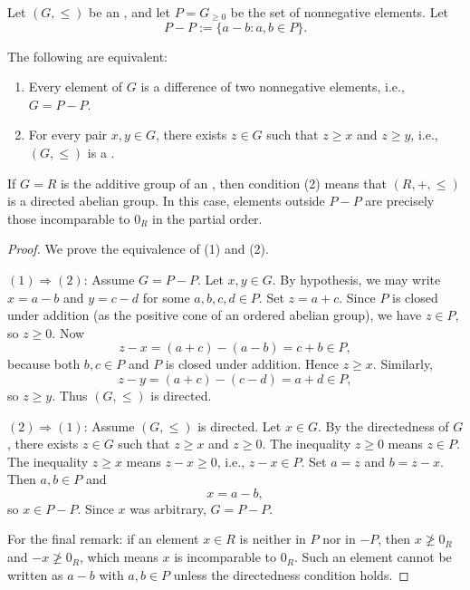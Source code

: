 \begin{proposition} \label{proposition:ordered_abelian_group_equals_P_minus_P_iff_directed}
    Let $(G,\leq)$ be an , and let $P = G_{\geq 0}$ be the set of nonnegative elements. Let
    $$P - P := \{a - b : a,b \in P\}.$$

    The following are equivalent:
    \begin{enumerate}
        \item Every element of $G$ is a difference of two nonnegative elements, i.e., $G = P - P$.
        \item For every pair $x,y \in G$, there exists $z \in G$ such that $z \geq x$ and $z \geq y$, i.e., $(G,\leq)$ is a .
    \end{enumerate}

    If $G = R$ is the additive group of an , then condition (2) means that $(R,+,\leq)$ is a directed abelian group. In this case, elements outside $P - P$ are precisely those incomparable to $0_R$ in the partial order.
\end{proposition}

\begin{proof}
    We prove the equivalence of (1) and (2).

    $(1) \Rightarrow (2)$: Assume $G = P - P$. Let $x,y \in G$. By hypothesis, we may write $x = a - b$ and $y = c - d$ for some $a,b,c,d \in P$. Set $z = a + c$. Since $P$ is closed under addition (as the positive cone of an ordered abelian group), we have $z \in P$, so $z \geq 0$. Now
    $$z - x = (a + c) - (a - b) = c + b \in P,$$
    because both $b,c \in P$ and $P$ is closed under addition. Hence $z \geq x$. Similarly,
    $$z - y = (a + c) - (c - d) = a + d \in P,$$
    so $z \geq y$. Thus $(G,\leq)$ is directed.

    $(2) \Rightarrow (1)$: Assume $(G,\leq)$ is directed. Let $x \in G$. By the directedness of $G$, there exists $z \in G$ such that $z \geq x$ and $z \geq 0$. The inequality $z \geq 0$ means $z \in P$. The inequality $z \geq x$ means $z - x \geq 0$, i.e., $z - x \in P$. Set $a = z$ and $b = z - x$. Then $a,b \in P$ and
    $$x = a - b,$$
    so $x \in P - P$. Since $x$ was arbitrary, $G = P - P$.

    For the final remark: if an element $x \in R$ is neither in $P$ nor in $-P$, then $x \not\geq 0_R$ and $-x \not\geq 0_R$, which means $x$ is incomparable to $0_R$. Such an element cannot be written as $a - b$ with $a,b \in P$ unless the directedness condition holds.
\end{proof}
